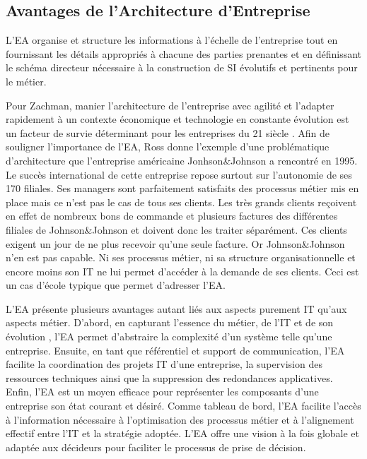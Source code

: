 


\subsection{Avantages de l'Architecture d'Entreprise}
L'EA organise et structure les informations à l'échelle de l'entreprise tout en fournissant les détails appropriés à chacune des parties prenantes et en définissant le schéma directeur nécessaire à la construction de SI évolutifs et pertinents pour le métier. 


Pour Zachman, manier l'architecture de l'entreprise avec agilité et l'adapter rapidement à un contexte économique et technologie en constante évolution est un facteur de survie déterminant pour les entreprises du 21 siècle \cite{zachman1997enterprise}. Afin de souligner l'importance de l'EA, Ross \cite{rossyoutube} donne l'exemple d'une problématique d'architecture que l'entreprise américaine Jonhson\&Johnson a rencontré en 1995. Le succès international de cette entreprise repose surtout sur l'autonomie de ses 170 filiales. Ses managers sont parfaitement satisfaits des processus métier mis en place mais ce n'est pas le cas de tous ses clients. Les très grands clients reçoivent  en effet de nombreux bons de commande et plusieurs factures des différentes filiales de Johnson\&Johnson et doivent donc les traiter séparément. Ces clients exigent un jour de ne plus recevoir qu'une seule facture. Or Johnson\&Johnson n'en est pas capable. Ni ses processus métier, ni sa structure organisationnelle et encore moins son IT ne lui permet d'accéder à la demande de ses clients. Ceci est un cas d'école typique que permet d'adresser l'EA.

L'EA présente plusieurs avantages autant liés aux aspects purement IT qu'aux aspects métier. D'abord, en capturant l'essence du métier, de l'IT et de son évolution \cite{lankhorst2013enterprise}, l'EA permet d'abstraire la complexité d'un système telle qu'une entreprise. Ensuite, en tant que référentiel et support de communication, l'EA facilite la coordination des projets IT d'une entreprise, la supervision des ressources techniques ainsi que la suppression des redondances applicatives\cite{shah2007frameworks}. Enfin, l'EA est un moyen efficace pour représenter les composants d'une entreprise son état courant et désiré. Comme tableau de bord, l'EA facilite l'accès à l'information nécessaire à l'optimisation des processus métier et à l'alignement effectif entre l'IT et la stratégie adoptée. L'EA offre une vision à la fois globale et adaptée aux décideurs pour faciliter le processus de prise de décision. 

